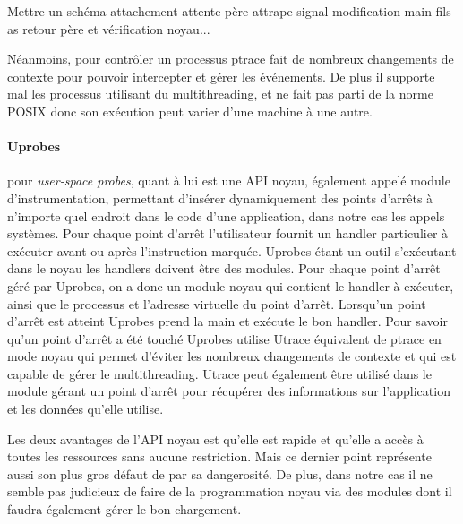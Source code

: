 {\color{red} Mettre un schéma attachement attente père attrape signal
  modification main fils as retour père et vérification noyau...}

Néanmoins, pour contrôler un processus ptrace fait de nombreux changements de
contexte pour pouvoir intercepter et gérer les événements. De plus il supporte
mal les processus utilisant du multithreading, et ne fait pas parti de la norme
POSIX donc son exécution peut varier d'une machine à une autre.

\paragraph{Uprobes}\cite{INTERCEPTION:AS, INTERCEPTION:MARION}
pour \textit{user-space probes}, quant à lui est une API noyau, également appelé
module d'instrumentation, permettant d'insérer dynamiquement des points d'arrêts
à n'importe quel endroit dans le code d'une application, dans notre cas les
appels systèmes. Pour chaque point d'arrêt l’utilisateur fournit un handler
particulier à exécuter avant ou après l’instruction marquée. Uprobes étant un
outil s'exécutant dans le noyau les handlers doivent être des modules. Pour
chaque point d'arrêt géré par Uprobes, on a donc un module noyau qui contient le
handler à exécuter, ainsi que le processus et l'adresse virtuelle du point
d'arrêt. Lorsqu'un point d'arrêt est atteint Uprobes prend la main et exécute le
bon handler. Pour savoir qu'un point d'arrêt a été touché Uprobes utilise Utrace
équivalent de ptrace en mode noyau qui permet d'éviter les nombreux changements
de contexte et qui est capable de gérer le multithreading. Utrace peut également
être utilisé dans le module gérant un point d'arrêt pour récupérer des
informations sur l'application et les données qu'elle utilise.

Les deux avantages de l'API noyau est qu'elle est rapide et qu'elle a accès à
toutes les ressources sans aucune restriction. Mais ce dernier point représente
aussi son plus gros défaut de par sa dangerosité. De plus, dans notre cas il ne
semble pas judicieux de faire de la programmation noyau via des modules dont il
faudra également gérer le bon chargement.

